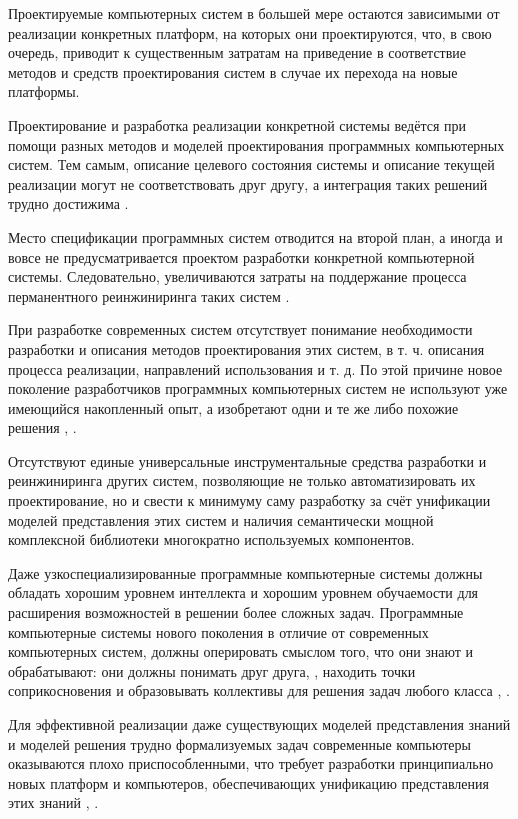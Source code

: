 \begin{textitemize}
   \item Проектируемые компьютерных систем в большей мере остаются зависимыми от реализации конкретных платформ, на которых они проектируются, что, в свою очередь, приводит к существенным затратам на приведение в соответствие методов и средств проектирования систем в случае их перехода на новые платформы.
   \item Проектирование и разработка реализации конкретной системы ведётся при помощи разных методов и моделей проектирования программных компьютерных систем. Тем самым, описание целевого состояния системы и описание текущей реализации могут не соответствовать друг другу, а интеграция таких решений трудно достижима .
   \item Место спецификации программных систем отводится на второй план, а иногда и вовсе не предусматривается проектом разработки конкретной компьютерной системы. Следовательно, увеличиваются затраты на поддержание процесса перманентного реинжиниринга таких систем .
   \item При разработке современных систем отсутствует понимание необходимости разработки и описания методов проектирования этих систем, в т. ч. описания процесса реализации, направлений использования и т. д. По этой причине новое поколение разработчиков программных компьютерных систем не используют уже имеющийся накопленный опыт, а изобретают одни и те же либо похожие решения , .
   \item Отсутствуют единые универсальные инструментальные средства разработки \cite{kabilan2007ontology} и реинжиниринга других систем, позволяющие не только автоматизировать их проектирование, но и свести к минимуму саму разработку за счёт унификации моделей представления этих систем и наличия семантически мощной комплексной библиотеки многократно используемых компонентов.
   \item Даже узкоспециализированные программные компьютерные системы должны обладать хорошим уровнем интеллекта и хорошим уровнем обучаемости для расширения возможностей в решении более сложных задач. Программные компьютерные системы нового поколения в отличие от современных компьютерных систем, должны оперировать смыслом того, что они знают и обрабатывают: они должны понимать друг друга, \cite{ouksel1999semantic}, \cite{neiva2016towards} находить точки соприкосновения и образовывать коллективы для решения задач любого класса , \cite{zhou2022cognitive}.
   \item Для эффективной реализации даже существующих моделей представления знаний и моделей решения трудно формализуемых задач современные компьютеры оказываются плохо приспособленными, что требует разработки принципиально новых платформ и компьютеров, обеспечивающих унификацию представления этих знаний \cite{hagoort2009semantic}, \cite{siekmann1984universal}.
\end{textitemize}

